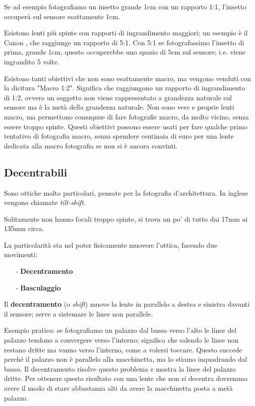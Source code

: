 Se ad esempio fotografiamo un insetto grande 1cm con un rapporto 1:1, l'insetto occuperà sul sensore esattamente 1cm.

Esistono lenti più spinte con rapporti di ingrandimento maggiori; un esempio è il Canon , che raggiunge un rapporto di 5:1. Con 5:1 se fotografassimo l'insetto di prima, grande 1cm, questo occuperebbe uno spazio di 5cm sul sensore; i.e. viene ingrandito 5 volte.

Esistono tanti obiettivi che non sono esattamente macro, ma vengono venduti con la dicitura "Macro 1:2". Significa che raggiungono un rapporto di ingrandimento di 1:2, ovvero un soggetto non viene rappresentato a grandezza naturale sul sensore ma è la metà della grandezza naturale. Non sono vere e proprie lenti macro, ma permettono comuqnue di fare fotografie macro, da molto vicino, senza essere troppo spinte. Questi obiettivi possono essere usati per fare qualche primo tentativo di fotografia macro, senza spendere centinaia di euro per una lente dedicata alla macro fotografia se non si è ancora convinti.


\subsection{Decentrabili} \label{subsec:lentidecentrabili}
Sono ottiche molto particolari, pensate per la fotografia d'architettura. In inglese vengono chiamate \textit{tilt-shift}.

Solitamente non hanno focali troppo spinte, si trova un po' di tutto dai 17mm ai 135mm circa.

La particolarità sta nel poter fisicamente muovere l'ottica, facendo due movimenti:
\begin{itemize}
    \item[-] \textbf{Decentramento}
    \item[-] \textbf{Basculaggio}
\end{itemize}

Il \textbf{decentramento} (o \textit{shift}) muove la lente in parallelo a destra e sinistra davanti il sensore; serve a sistemare le linee non parallele.

Esempio pratico: se fotografiamo un palazzo dal basso verso l'alto le linee del palazzo tendono a convergere verso l'interno; significa che salendo le linee non restano dritte ma vanno verso l'interno, come a volersi toccare. Questo succede perché il palazzo non è parallelo alla macchinetta, ma lo stiamo inquadrando dal basso. Il decentramento risolve questo problema e mostra la linee del palazzo dritte.
Per ottenere questo risultato con una lente che non si decentra dovremmo avere il modo di stare abbastanza alti da avere la macchinetta posta a metà palazzo.

